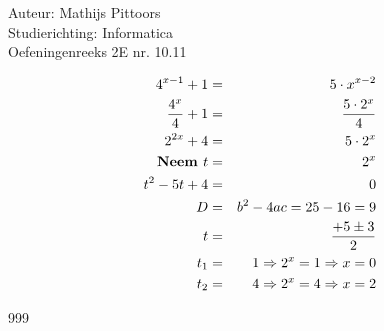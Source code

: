 \documentclass[a4paper]{article}
\begin{document}
  
\noindent \large Auteur: Mathijs Pittoors \\
\noindent \large Studierichting: Informatica\\
\noindent \large Oefeningenreeks 2E nr. 10.11\\

\medskip

\normalsize

\begin{eqnarray*}
    4^{x-1} + 1 &=& 5 \cdot x^{x-2} \\
    \dfrac{4^x}{4} + 1 &=& \dfrac{5 \cdot 2^x}{4}\\
    2^{2x} + 4 &=& 5 \cdot 2^x\\
    \text{\textbf{Neem }} t & = &2^x\\
    t^2 -5t + 4 &=& 0\\
    D &=& b^2 - 4ac = 25 - 16 = 9\\
    t &=& \dfrac{+5 \pm 3}{2}\\
    t_1 &=& 1 \Rightarrow 2^x = 1 \Rightarrow x = 0\\
    t_2 &=& 4 \Rightarrow 2^x = 4 \Rightarrow x = 2\\
\end{eqnarray*}


\begin{thebibliography}{999}
\end{thebibliography}
\end{document}
